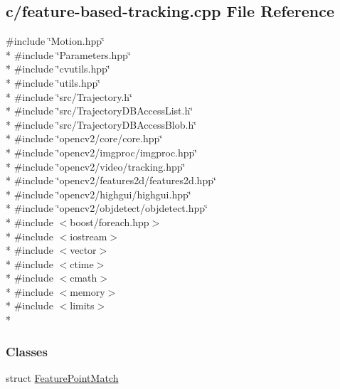 \hypertarget{feature-based-tracking_8cpp}{\subsection{c/feature-\/based-\/tracking.cpp File Reference}
\label{feature-based-tracking_8cpp}
}
{\ttfamily \#include \char`\"{}Motion.\-hpp\char`\"{}}\\*
{\ttfamily \#include \char`\"{}Parameters.\-hpp\char`\"{}}\\*
{\ttfamily \#include \char`\"{}cvutils.\-hpp\char`\"{}}\\*
{\ttfamily \#include \char`\"{}utils.\-hpp\char`\"{}}\\*
{\ttfamily \#include \char`\"{}src/\-Trajectory.\-h\char`\"{}}\\*
{\ttfamily \#include \char`\"{}src/\-Trajectory\-D\-B\-Access\-List.\-h\char`\"{}}\\*
{\ttfamily \#include \char`\"{}src/\-Trajectory\-D\-B\-Access\-Blob.\-h\char`\"{}}\\*
{\ttfamily \#include \char`\"{}opencv2/core/core.\-hpp\char`\"{}}\\*
{\ttfamily \#include \char`\"{}opencv2/imgproc/imgproc.\-hpp\char`\"{}}\\*
{\ttfamily \#include \char`\"{}opencv2/video/tracking.\-hpp\char`\"{}}\\*
{\ttfamily \#include \char`\"{}opencv2/features2d/features2d.\-hpp\char`\"{}}\\*
{\ttfamily \#include \char`\"{}opencv2/highgui/highgui.\-hpp\char`\"{}}\\*
{\ttfamily \#include \char`\"{}opencv2/objdetect/objdetect.\-hpp\char`\"{}}\\*
{\ttfamily \#include $<$boost/foreach.\-hpp$>$}\\*
{\ttfamily \#include $<$iostream$>$}\\*
{\ttfamily \#include $<$vector$>$}\\*
{\ttfamily \#include $<$ctime$>$}\\*
{\ttfamily \#include $<$cmath$>$}\\*
{\ttfamily \#include $<$memory$>$}\\*
{\ttfamily \#include $<$limits$>$}\\*
\subsubsection*{Classes}
\begin{DoxyCompactItemize}
\item 
struct \hyperlink{structFeaturePointMatch}{Feature\-Point\-Match}
\end{DoxyCompactItemize}
